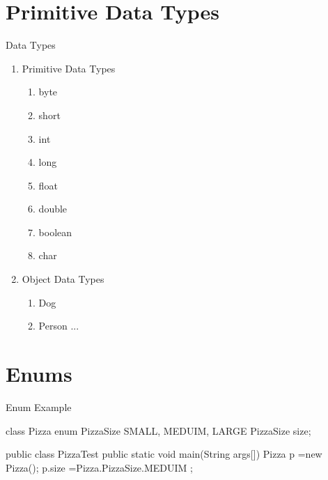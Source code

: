 \documentclass[11pt]{beamer}
\begin{document}
\section{Primitive Data Types}
\begin{frame}{Data Types}
\begin{enumerate}
\item Primitive Data Types
\begin{enumerate}
\item byte
\item short
\item int
\item long
\item float
\item double
\item boolean
\item char
\end{enumerate}
\item Object Data Types
\begin{enumerate}
\item Dog
\item Person ...
\end{enumerate}
\end{enumerate}
\end{frame}

\section{Enums}
\begin{frame}[containsverbatim]{Enum Example}
\begin{java}
class Pizza{
	enum PizzaSize{ SMALL, MEDUIM, LARGE }
	PizzaSize size;
}

public class PizzaTest{
	public static void main(String args[]){
		Pizza p =new Pizza();
		p.size =Pizza.PizzaSize.MEDUIM ;
	}
}
\end{java}
\end{frame}



\end{document}
